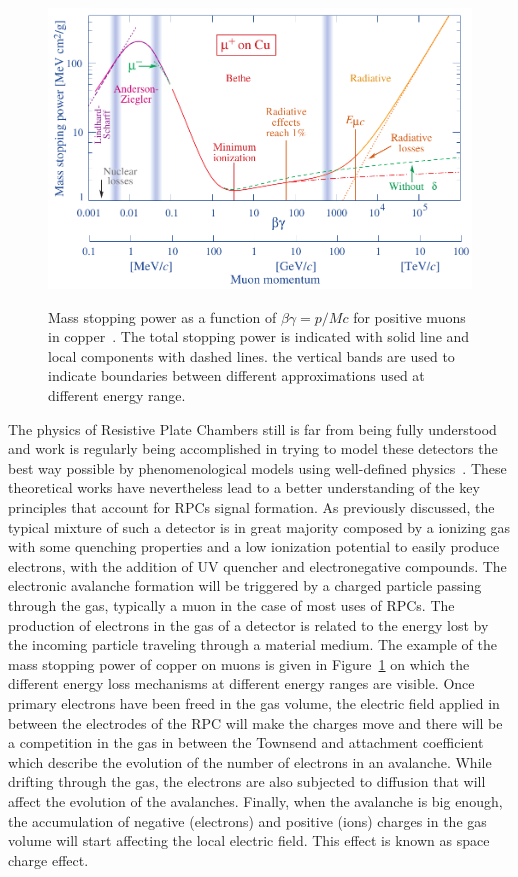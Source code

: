 	\begin{figure}[H]
		\centering
		\includegraphics[width = \plotwidth]{fig/chapt4/rpp_icru49_cu_col.pdf}\\
		\caption{\label{fig:enerlylosscopper} Mass stopping power as a function of $\beta\gamma = p/Mc$ for positive muons in copper~\cite{PDG2018}. The total stopping power is indicated with solid line and local components with dashed lines. the vertical bands are used to indicate boundaries between different approximations used at different energy range.}
	\end{figure}

	The physics of Resistive Plate Chambers still is far from being fully understood and work is regularly being accomplished in trying to model these detectors the best way possible by phenomenological models using well-defined physics~\cite{LIPPMANN2003,VINCENT2016,VINCENT2017}. These theoretical works have nevertheless lead to a better understanding of the key principles that account for RPCs signal formation. As previously discussed, the typical mixture of such a detector is in great majority composed by a ionizing gas with some quenching properties and a low ionization potential to easily produce electrons, with the addition of UV quencher and electronegative compounds. The electronic avalanche formation will be triggered by a charged particle passing through the gas, typically a muon in the case of most uses of RPCs. The production of electrons in the gas of a detector is related to the energy lost by the incoming particle traveling through a material medium. The example of the mass stopping power of copper on muons is given in Figure~\ref{fig:enerlylosscopper} on which the different energy loss mechanisms at different energy ranges are visible. Once primary electrons have been freed in the gas volume, the electric field applied in between the electrodes of the RPC will make the charges move and there will be a competition in the gas in between the Townsend and attachment coefficient which describe the evolution of the number of electrons in an avalanche. While drifting through the gas, the electrons are also subjected to diffusion that will affect the evolution of the avalanches. Finally, when the avalanche is big enough, the accumulation of negative (electrons) and positive (ions) charges in the gas volume will start affecting the local electric field. This effect is known as space charge effect.
	
